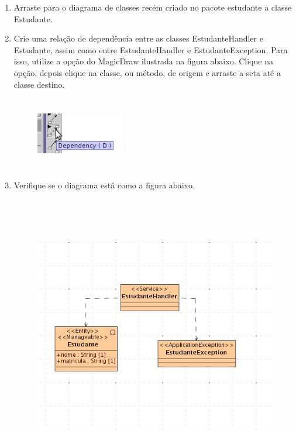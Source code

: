\begin{enumerate}
\item Arraste para o diagrama de classes recém criado no pacote estudante a classe Estudante.
	
\item Crie uma relação de dependência entre as classes EstudanteHandler e Estudante, assim como entre EstudanteHandler e EstudanteException. Para isso, utilize a opção do MagicDraw ilustrada na figura abaixo. Clique na opção, depois clique na classe, ou método, de origem e arraste a seta até a classe destino.

\begin{figure}[!htb]
	\centering
	\includegraphics[width=110pt,height=90pt]{imgs/tutorial-mdarte-0012.png}
\end{figure}

\item Verifique se o diagrama está como a figura abaixo.
\begin{figure}[!htb]
	\centering
	\includegraphics[width=300pt,height=350pt]{imgs/tutorial-mdarte-0011.png}
\end{figure}


\end{enumerate}
